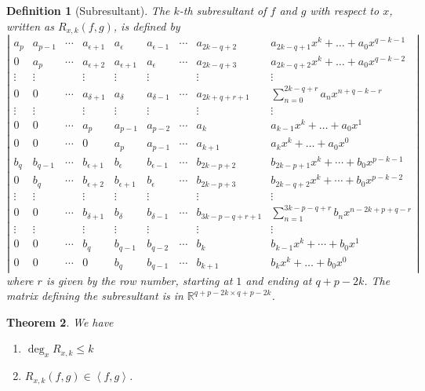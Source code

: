 \documentclass{article}%
\newtheorem{theorem}{Theorem}
\newtheorem{definition}[theorem]{Definition}
\begin{document}
\begin{definition}
[Subresultant]The $k$-th subresultant of $f$ and $g$ with respect to $x$,
written as $R_{x,k}\left(  f,g\right)  $, is defined by%
\[
\left|
\begin{array}{ccccccccc}
    a_p & a_{p-1} & \cdots& a_{\epsilon+1} & a_\epsilon & a_{\epsilon-1} &\cdots & a_{2k-q+2} & a_{2k-q+1}x^k+\dots+a_0x^{q-k-1}\\
    0 & a_p & \cdots & a_{\epsilon+2} & a_{\epsilon+1} & a_\epsilon & \cdots & a_{2k-q+3}& a_{2k-q+2}x^k+\dots+a_0x^{q-k-2}\\
    \vdots & \vdots & & \vdots & \vdots & \vdots & &\vdots & \vdots\\
    0 & 0 & \cdots & a_{\delta+1} & a_\delta & a_{\delta-1}&\cdots&a_{2k+q+r+1} & \sum_{n=0}^{2k-q+r} a_nx^{n+q-k-r}\\
    \vdots & \vdots & & \vdots & \vdots & \vdots & &\vdots & \vdots\\
    0 & 0 & \cdots & a_p & a_{p-1} & a_{p-2} &\cdots &a_k& a_{k-1}x^k+\dots+a_0x^1\\
    0 & 0 &\cdots & 0 & a_p & a_{p-1} & \cdots & a_{k+1} &  a_kx^k+\dots+a_0x^0\\
    
    b_q & b_{q-1} & \cdots & b_{\epsilon+1} & b_\epsilon & b_{\epsilon-1} & \cdots & b_{2k-p+2} & b_{2k-p+1}x^k+\cdots+b_0x^{p-k-1} \\
    0 & b_q & \cdots & b_{\epsilon+2} & b_{\epsilon+1} & b_\epsilon & \cdots & b_{2k-p+3}& b_{2k-q+2}x^k+\cdots + b_0x^{p-k-2}\\
    \vdots & \vdots & & \vdots & \vdots & \vdots & &\vdots & \vdots\\
    0 & 0 & \cdots & b_{\delta+1} & b_\delta & b_{\delta-1} & \cdots & b_{3k-p-q+r+1} & \sum_{n=1}^{3k-p-q+r} b_nx^{n-2k+p+q-r}\\
    \vdots & \vdots & & \vdots & \vdots & \vdots & &\vdots & \vdots\\
    0 & 0 & \cdots & b_q & b_{q-1} & b_{q-2} &\cdots & b_k & b_{k-1}x^k +\cdots+ b_0x^1\\
    0 & 0 & \cdots & 0 & b_q & b_{q-1} & \cdots & b_{k+1} & b_kx^k+\dots+b_0x^0
\end{array}
\right|
\]
where $r$ is given by the row number, starting at $1$ and ending at $q+p-2k$. The matrix defining the subresultant is in $\mathbb{R}^{q+p-2k \times q+p-2k}$.
\end{definition}

\begin{theorem}
We have

\begin{enumerate}
\item $\deg_{x}R_{x,k}\leq k$

\item $R_{x,k}\left(  f,g\right)  \in\left\langle f,g\right\rangle $.
\end{enumerate}
\end{theorem}
\end{document}
